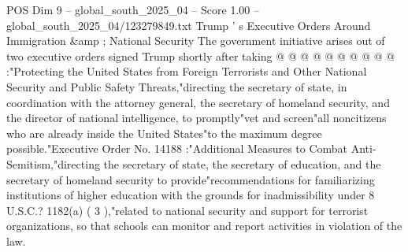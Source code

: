 \begin{textsample}{POS Dim 9 – global\_south\_2025\_04 – Score 1.00 – global\_south\_2025\_04/123279849.txt}
Trump ' s Executive Orders Around Immigration \&amp ; National Security The government initiative arises out of two executive orders signed Trump shortly after taking @ @ @ @ @ @ @ @ @ @ :"Protecting the United States from Foreign Terrorists and Other National Security and Public Safety Threats,"directing the secretary of state, in coordination with the attorney general, the secretary of homeland security, and the director of national intelligence, to promptly"vet and screen"all noncitizens who are already inside the United States"to the maximum degree possible."Executive Order No. 14188 :"Additional Measures to Combat Anti-Semitism,"directing the secretary of state, the secretary of education, and the secretary of homeland security to provide"recommendations for familiarizing institutions of higher education with the grounds for inadmissibility under 8 U.S.C.? 1182(a) ( 3 ),"related to national security and support for terrorist organizations, so that schools can monitor and report activities in violation of the law.

\end{textsample}
